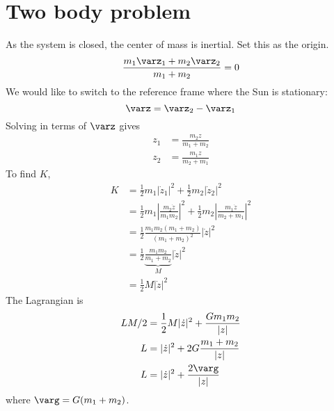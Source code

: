 \documentclass{scrbook}
\numberwithin{thms}{chapter}
\newcommand{\der}{\dot}
\begin{document}
\section{Two body problem}
As the system is closed, the center of mass is inertial. Set this as the origin.
\[
  \frac{m_1\varz_1+m_2\varz_2}{m_1+m_2} = 0
\]
We would like to switch to the reference frame where the Sun is stationary:
\[
  \varz=\varz_2-\varz_1
\]
Solving in terms of $\varz$ gives 
\begin{align*}
  z_1&=\frac{m_2z}{m_1+m_2} \\
  z_2&=\frac{m_1z}{m_2+m_1} 
\end{align*}
To find $K$,
\begin{align*}
  K&=\frac12 m_1|\der z_1|^2+\frac12 m_2|\der z_2|^2 \\
   &=\frac12 m_1\left|\frac{m_2\der z}{m_1m_2}\right|^2+\frac12 m_2\left|\frac{m_1\der z}{m_2+m_1}\right|^2 \\
   &=\frac12\frac{m_1m_2(m_1+m_2)}{(m_1+m_2)^2}|\der z|^2 \\
   &=\frac 12 \underbrace{\frac{m_1m_2}{m_1+m_2}}_M |\der z|^2 \\
   &=\frac 12 M |\der z|^2
\end{align*}
The Lagrangian is 
\begin{align*}
 LM/2 &= \frac 12 M |\der z|^2+ \frac{Gm_1m_2}{|z|} \\
  L  &= |\der z|^2 + 2G\frac{m_1+m_2}{|z|} \\
  L &= |\der z|^2 + \frac {2\varg} {|z|}
\end{align*}
where $\varg =  G(m_1+m_2)$. 
\end{document}
